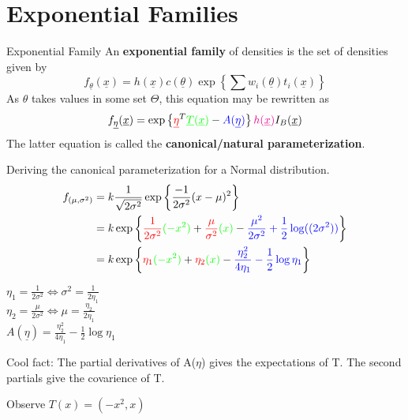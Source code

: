 \documentclass[11pt,fleqn]{book} %
\begin{document}
\section{Exponential Families}

	\begin{definition}{Exponential Family} An \textbf{exponential family} of densities is the set of densities given by 
	$$f_{\underline{\theta}}(\underline{x})= h(\underline{x})c(\underline{\theta})\exp\left\{\sum w_i(\underline{\theta})t_i(\underline{x})\right\} $$
	As $\theta$ takes values in some set $\Theta$, this equation may be rewritten as
	$$f_{\underline{\eta}}(\underline{x})= \exp\left\{\textcolor{red}{\underline{\eta}}^T\textcolor{green}{\underline{T}(\underline{x})}-\textcolor{blue}{A(\underline{\eta})}\right\}\textcolor{magenta}{h(\underline{x})} I_B(\underline{x}) $$
	The latter equation is called the \textbf{canonical/natural parameterization}.
	\end{definition}

	\begin{example}
		Deriving the canonical parameterization for a Normal distribution.
		\begin{align*}
			f_{(\mu,\sigma^2)} &= k \frac{1}{\sqrt{2\sigma^2}}\exp\left\{\frac{-1}{2\sigma^2}(x-\mu)^2 \right\}\\
			&= k \exp\left\{\textcolor{red}{\frac{1}{2\sigma^2}} \textcolor{green}{(-x^2)} + \textcolor{red}{\frac{\mu}{\sigma^2}} \textcolor{green}{(x)} - \textcolor{blue}{\frac{\mu^2}{2\sigma^2}+\frac{1}{2}\log((2\sigma^2))} \right\}\\
			&= k \exp\left\{\textcolor{red}{\eta_1} \textcolor{green}{(-x^2)} + \textcolor{red}{\eta_2} \textcolor{green}{(x)} - \textcolor{blue}{\frac{\eta_2^2}{4\eta_1} - \frac{1}{2}\log\eta_1 } \right\}
		\end{align*}

		$\eta_1 = \frac{1}{2\sigma^2} \Leftrightarrow \sigma^2 = \frac{1}{2\eta_1}$\\
		$\eta_2 = \frac{\mu}{2\sigma^2} \Leftrightarrow \mu = \frac{\eta_2}{2\eta_1}$\\
		$A(\underline{\eta})= \frac{\eta_2^2}{4\eta_1} - \frac{1}{2}\log\eta_1 $

	\end{example}

	Cool fact: The partial derivatives of A($\eta$) gives the expectations of T. The second partials give the covarience of T.

	Observe $T(x)=(-x^2,x)$
\end{document}
